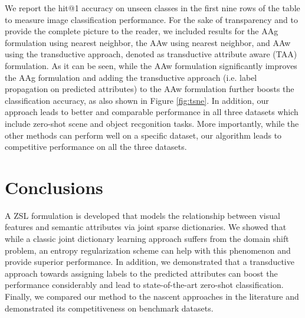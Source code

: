 \documentclass[letterpaper]{article} %
\begin{document}
We report the hit@1 accuracy  on unseen classes in the first nine rows of the table to measure image classification performance. For the sake of transparency and to provide the complete picture to the reader, we included results for the AAg formulation using nearest neighbor, the AAw using nearest neighbor, and AAw using the transductive approach, denoted as transductive attribute aware (TAA) formulation. As it can be seen, while the AAw formulation significantly improves the AAg formulation and adding the transductive approach (i.e. label propagation on predicted attributes) to the AAw formulation further boosts the classification accuracy, as also shown in Figure \ref{fig:tsne}.  In addition, our approach leads to better and comparable performance in all three datasets which include zero-shot scene and object recgonition tasks. More importantly, while the other methods can perform well on a specific dataset,  our algorithm leads to competitive performance on all the three datasets.%


\section{Conclusions}
\label{sec:conclusion}
A ZSL formulation is developed that models the relationship between  visual features  and semantic attributes via joint sparse dictionaries. We showed that while a classic joint dictionary learning approach suffers from the domain shift problem, an entropy regularization scheme can help with this phenomenon and provide superior performance. In addition, we demonstrated that a transductive approach towards assigning labels to the predicted attributes can boost the performance considerably and lead to state-of-the-art zero-shot classification.  Finally, we compared our method to the nascent approaches in the literature and demonstrated its competitiveness on benchmark datasets.


\clearpage





 

\clearpage 
\end{document}

